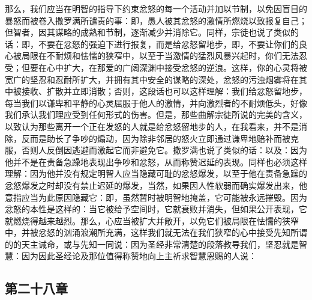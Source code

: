 那么，我们应当在明智的指导下约束忿怒的每一个活动并加以节制，以免因盲目的暴怒而被卷入撒罗满所谴责的事：即，愚人被其忿怒的激情所燃烧以致报复自己；但智者，因其谋略的成熟和节制，逐渐减少并消除它。同样，宗徒也说了类似的话：即，不要在忿怒的强迫下进行报复，而是给忿怒留地步，即，不要让你们的良心被局限在不耐烦和怯懦的狭窄中，以至于当激情的猛烈风暴兴起时，你们无法忍受；但要在心中扩大，在那爱的广阔深渊中接受忿怒的逆浪。这样，你的心灵将被宽广的坚忍和忍耐所扩大，并拥有其中安全的谋略的深处，忿怒的污浊烟雾将在其中被接收、扩散并立即消散；否则，这段话也可以这样理解：我们给忿怒留地步，每当我们以谦卑和平静的心灵屈服于他人的激情，并向激烈者的不耐烦低头，好像我们承认我们理应受到任何形式的伤害。但是，那些曲解宗徒所说的完美的含义，以致认为那些离开一个正在发怒的人就是给忿怒留地步的人，在我看来，并不是消除，反而是助长了争吵的煽动，因为除非邻居的怒火立即通过谦卑地赔补而被克服，否则人反倒因逃避而激起它而非避免它。撒罗满也说了类似的话：以及：因为他并不是在责备急躁地表现出争吵和忿怒，从而称赞迟延的表现。同样也必须这样理解：因为他并没有规定明智人应当隐藏可耻的忿怒爆发，以至于他在责备急躁的忿怒爆发之时却没有禁止迟延的爆发，当然，如果因人性软弱而确实爆发出来，他意指应当为此原因隐藏它：即，虽然暂时被明智地掩盖，它可能被永远摧毁。因为忿怒的本性是这样的：当它被给予空间时，它就衰败并消失，但如果公开表现，它就燃烧得越来越烈。那么，心应当被扩大并敞开，以免它们被局限在怯懦的狭窄中，并被忿怒的汹涌浪潮所充满，这样我们就无法在我们狭窄的心中接受先知所谓的的天主诫命，或与先知一同说：因为圣经非常清楚的段落教导我们，坚忍就是智慧：因为因此圣经论及那位值得称赞地向上主祈求智慧恩赐的人说：\par


\subsection{第二十八章}

\par


